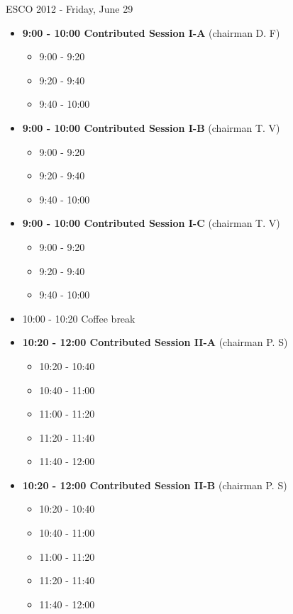 \documentclass[10pt, A4]{article}%
\begin{document}
\newpage

\centerline{\huge ESCO 2012 - Friday, June 29}
\vspace{4mm}

\begin{itemize}    
  \item {\bf 9:00 - 10:00 Contributed Session I-A} (chairman D. F) 
  \begin{itemize}
    \item 9:00 - 9:20 
    \item 9:20 - 9:40 
    \item 9:40 - 10:00
  \end{itemize}
  \item {\bf 9:00 - 10:00 Contributed Session I-B} (chairman T. V) 
  \begin{itemize}
    \item 9:00 - 9:20 
    \item 9:20 - 9:40 
    \item 9:40 - 10:00
  \end{itemize}
  \item {\bf 9:00 - 10:00 Contributed Session I-C} (chairman T. V) 
  \begin{itemize}
    \item 9:00 - 9:20 
    \item 9:20 - 9:40 
    \item 9:40 - 10:00
  \end{itemize}
  \item 10:00 - 10:20 Coffee break
  \item {\bf 10:20 - 12:00 Contributed Session II-A} (chairman P. S) 
  \begin{itemize}
    \item 10:20 - 10:40 
    \item 10:40 - 11:00 
    \item 11:00 - 11:20 
    \item 11:20 - 11:40 
    \item 11:40 - 12:00 
  \end{itemize}
    \item {\bf 10:20 - 12:00 Contributed Session II-B} (chairman P. S) 
  \begin{itemize}
    \item 10:20 - 10:40 
    \item 10:40 - 11:00 
    \item 11:00 - 11:20 
    \item 11:20 - 11:40 
    \item 11:40 - 12:00  

\end{itemize}
\end{itemize}
\end{document}
